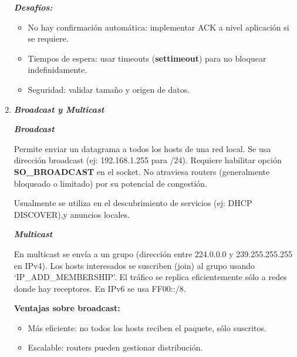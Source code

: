 \documentclass[12pt]{amsart}
\begin{document}
\begin{enumerate}
		\medskip \medskip

		\noindent \textbf{\textit{Desafíos:}}
		\medskip \medskip		
		\begin{itemize}
		\item No hay confirmación automática: implementar ACK a nivel aplicación si se requiere.
		\item Tiempos de espera: usar timeouts (\textbf{settimeout}) para no bloquear indefinidamente.
		\item Seguridad: validar tamaño y origen de datos.
		\end{itemize}
		
		\bigskip\bigskip
		
		\item \textbf{\textit{Broadcast y Multicast}}
		
		\medskip
		\noindent \textbf{\textit{Broadcast}}
		
		\medskip \medskip
		
		Permite enviar un datagrama a todos los hosts de una red local. Se usa dirección broadcast (ej: 192.168.1.255 para /24). Requiere habilitar opción \textbf{SO\_BROADCAST} en el socket. No atraviesa routers (generalmente bloqueado o limitado) por su potencial de congestión.

		Usualmente se utiliza en el descubrimiento de servicios (ej: DHCP DISCOVER),y anuncios locales.

		\medskip \medskip

		\noindent \textbf{\textit{Multicast}}
		
		\medskip \medskip
		En multicast se envía a un grupo (dirección entre 224.0.0.0 y 239.255.255.255 en IPv4). Los hosts interesados se suscriben (join) al grupo usando `IP\_ADD\_MEMBERSHIP'. El tráfico se replica eficientemente sólo a redes donde hay receptores. En IPv6 se usa FF00::/8.
		
		\medskip \medskip
		\noindent \textbf{Ventajas sobre broadcast:}

		\medskip \medskip

		\begin{itemize}
		\item Más eficiente: no todos los hosts reciben el paquete, sólo suscritos.
		\item Escalable: routers pueden gestionar distribución.
		\end{itemize}

		\medskip \medskip


\end{enumerate}
\end{document}
